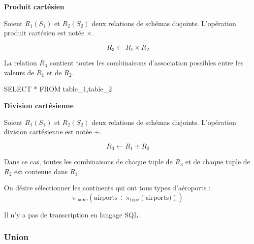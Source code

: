 \documentclass[10pt]{article}
\begin{document}
\begin{defi}

\textbf{Produit cartésien}

Soient $R_1(S_1)$ et $R_2(S_2)$ deux relations de schémas disjoints. L'opération produit cartésien est notée $\times$. 

$$
R_3 \leftarrow R_1 \times R_2
$$

La relation $R_3$ contient toutes les combinaisons d'association possibles entre les valeurs de $R_1$ et de $R_2$.

\begin{envsql}
\begin{sql}
SELECT * FROM table_1,table_2
\end{sql}
\end{envsql}

\end{defi}



\begin{defi}

\textbf{Division cartésienne}

Soient $R_1(S_1)$ et $R_2(S_2)$ deux relations de schémas disjoints. L'opération division cartésienne est notée $\div$. 

$$
R_3 \leftarrow R_1 \div R_2
$$

Dans ce cas, toutes les combinaisons de chaque tuple de $R_3$ et de chaque tuple de $R_2$ est contenue dans $R_1$.

\end{defi}


\begin{exemple}
On désire sélectionner les continents qui ont tous types d'aéroports :
$$
\pi_{\text{name}}\left(\text{airports} \div \pi_{\text{type}}\left( \text{airports})\right)\right)
$$

Il n'y a pas de transcription en langage SQL.
\end{exemple}



\subsubsection{Union}
\end{document}
